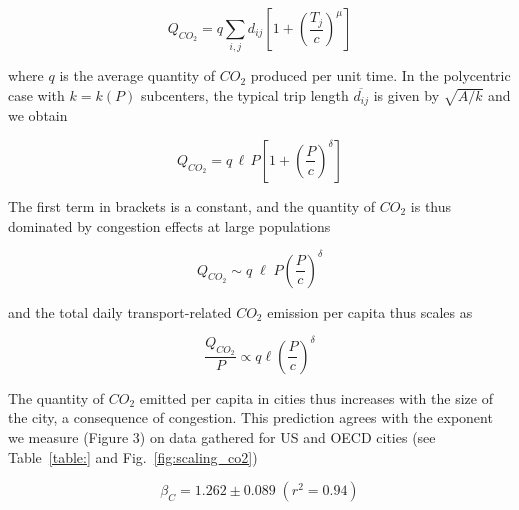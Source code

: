 \begin{equation}
    Q_{CO_2}  = q \sum_{i,j} d_{ij} \left[ 1+ \left( \frac{T_j}{c} \right)^\mu \right]
\end{equation}

where $q$ is the average quantity of $CO_2$ produced per unit time. In the
polycentric case with $k=k(P)$ subcenters, the typical trip length
$\overline{d_{ij}}$ is given by $\sqrt{A/k}$ and we obtain

\begin{equation}
    Q_{CO_2} = q\, \ell\, P \left[ 1 + \left(\frac{P}{c}\right)^{\delta} \right]
\end{equation}

The first term in brackets is a constant, and the quantity of $CO_2$ is thus
dominated by congestion effects at large populations

\begin{equation}
    Q_{CO_2} \sim q\; \ell\; P \left(\frac{P}{c}\right)^{\delta}
\end{equation}



and the total daily transport-related $CO_2$ emission per capita thus scales as 

\begin{equation}
    \frac{Q_{CO_2}}{P} \propto  q\ell \left(\frac{P}{c}\right)^{\delta}
\end{equation}

The quantity of $CO_2$ emitted per capita in cities thus increases with the size
of the city, a consequence of congestion. This prediction agrees with the
exponent we measure (Figure 3) on data gathered for US and OECD cities (see
Table~\ref{table:} and Fig.~\ref{fig:scaling_co2})

\begin{equation}
    \boxed{\beta_C = 1.262 \pm 0.089\;(r^2=0.94)}
\end{equation}

